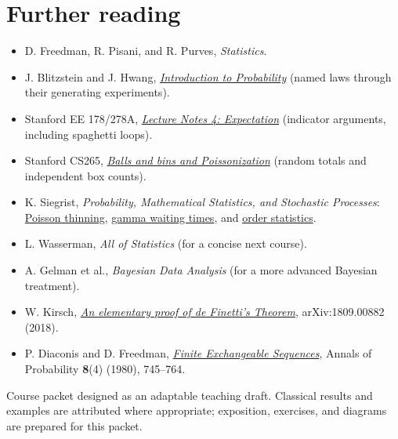 \documentclass[11pt,oneside,openany]{book}
\theoremstyle{course}
\theoremstyle{definition}
\begin{document}
\backmatter
\chapter*{Further reading}
\begin{itemize}
  \item D. Freedman, R. Pisani, and R. Purves, \emph{Statistics}.
  \item J. Blitzstein and J. Hwang,
  \href{https://stat110.hsites.harvard.edu/}{\emph{Introduction to Probability}}
  (named laws through their generating experiments).
  \item Stanford EE 178/278A,
  \href{https://isl.stanford.edu/~abbas/ee178/lect04-2.pdf}{\emph{Lecture Notes 4: Expectation}}
  (indicator arguments, including spaghetti loops).
  \item Stanford CS265,
  \href{https://web.stanford.edu/class/archive/cs/cs265/cs265.1212/Lectures/Lecture6/l6.pdf}{\emph{Balls and bins and Poissonization}}
  (random totals and independent box counts).
  \item K. Siegrist, \emph{Probability, Mathematical Statistics, and Stochastic Processes}:
  \href{https://www.randomservices.org/random/poisson/Splitting.html}{Poisson thinning},
  \href{https://www.randomservices.org/random/poisson/Gamma.html}{gamma waiting times}, and
  \href{https://www.randomservices.org/random/sample/OrderStatistics.html}{order statistics}.
  \item L. Wasserman, \emph{All of Statistics} (for a concise next course).
  \item A. Gelman et al., \emph{Bayesian Data Analysis} (for a more advanced Bayesian treatment).
  \item W. Kirsch, \href{https://arxiv.org/abs/1809.00882}{\emph{An elementary proof of de Finetti's Theorem}}, arXiv:1809.00882 (2018).
  \item P. Diaconis and D. Freedman, \href{https://doi.org/10.1214/aop/1176994663}{\emph{Finite Exchangeable Sequences}}, Annals of Probability \textbf{8}(4) (1980), 745--764.
\end{itemize}

\vfill
\begin{center}\color{muted}\small
Course packet designed as an adaptable teaching draft. Classical results and examples are attributed where appropriate; exposition, exercises, and diagrams are prepared for this packet.
\end{center}
\end{document}
